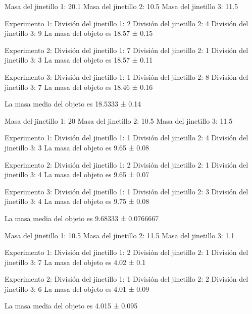 
Masa del jinetillo 1: 20.1
Masa del jinetillo 2: 10.5
Masa del jinetillo 3: 11.5

Experimento 1:
División del jinetillo 1: 2
División del jinetillo 2: 4
División del jinetillo 3: 9
La masa del objeto es 18.57 ± 0.15

Experimento 2:
División del jinetillo 1: 7
División del jinetillo 2: 1
División del jinetillo 3: 3
La masa del objeto es 18.57 ± 0.11

Experimento 3:
División del jinetillo 1: 1
División del jinetillo 2: 8
División del jinetillo 3: 7
La masa del objeto es 18.46 ± 0.16

La masa media del objeto es 18.5333 ± 0.14



Masa del jinetillo 1: 20
Masa del jinetillo 2: 10.5
Masa del jinetillo 3: 11.5

Experimento 1:
División del jinetillo 1: 1
División del jinetillo 2: 4
División del jinetillo 3: 3
La masa del objeto es 9.65 ± 0.08

Experimento 2:
División del jinetillo 1: 2
División del jinetillo 2: 1
División del jinetillo 3: 4
La masa del objeto es 9.65 ± 0.07

Experimento 3:
División del jinetillo 1: 1
División del jinetillo 2: 3
División del jinetillo 3: 4
La masa del objeto es 9.75 ± 0.08

La masa media del objeto es 9.68333 ± 0.0766667



Masa del jinetillo 1: 10.5
Masa del jinetillo 2: 11.5
Masa del jinetillo 3: 1.1

Experimento 1:
División del jinetillo 1: 2
División del jinetillo 2: 1
División del jinetillo 3: 7
La masa del objeto es 4.02 ± 0.1

Experimento 2:
División del jinetillo 1: 1
División del jinetillo 2: 2
División del jinetillo 3: 6
La masa del objeto es 4.01 ± 0.09

La masa media del objeto es 4.015 ± 0.095